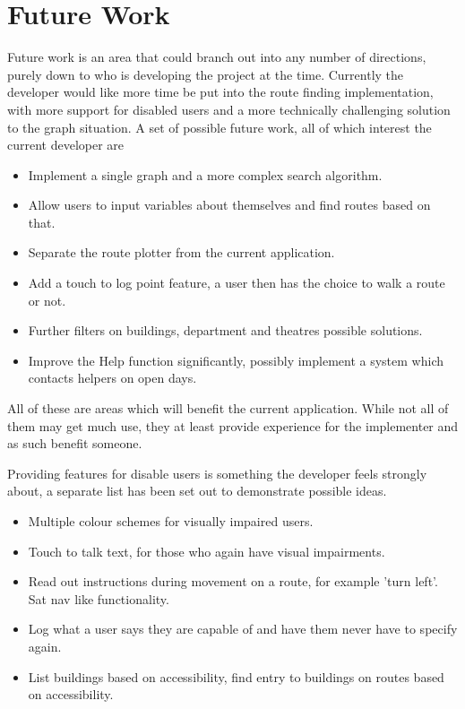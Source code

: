 \section{Future Work}
Future work is an area that could branch out into any number of directions, purely down to who is developing the project at the time. Currently the developer would like more time be put into the route finding implementation, with more support for disabled users and a more technically challenging solution to the graph situation. A set of possible future work, all of which interest the current developer are 
\begin{itemize}
   \item Implement a single graph and a more complex search algorithm.
   \item Allow users to input variables about themselves and find routes based on that.
   \item Separate the route plotter from the current application.
   \item Add a touch to log point feature, a user then has the choice to walk a route or not. 
   \item Further filters on buildings, department and theatres possible solutions. 
   \item Improve the Help function significantly, possibly implement a system which contacts helpers on open days. 
\end{itemize}

All of these are areas which will benefit the current application. While not all of them may get much use, they at least provide experience for the implementer and as such benefit someone. 

Providing features for disable users is something the developer feels strongly about, a separate list has been set out to demonstrate possible ideas. 

\begin{itemize}
   \item Multiple colour schemes for visually impaired users.
   \item Touch to talk text, for those who again have visual impairments.
   \item Read out instructions during movement on a route, for example 'turn left'. Sat nav like functionality.
   \item Log what a user says they are capable of and have them never have to specify again.  
   \item List buildings based on accessibility, find entry to buildings on routes based on accessibility. 
\end{itemize}

